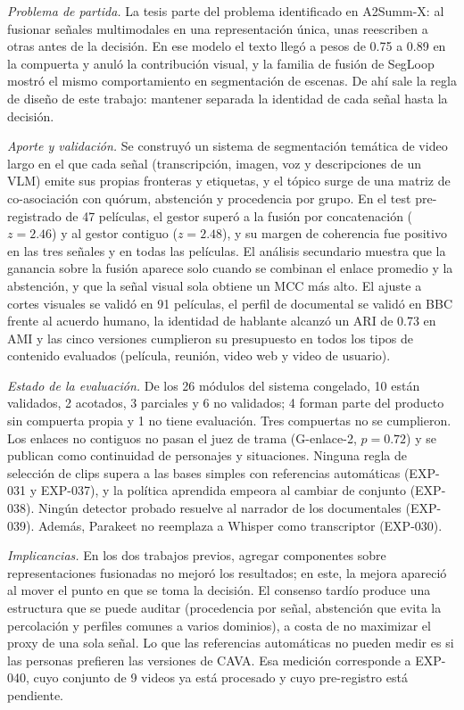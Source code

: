 
\textit{Problema de partida.} La tesis parte del problema identificado en A2Summ-X: al
fusionar señales multimodales en una representación única, unas reescriben a otras antes de
la decisión. En ese modelo el texto llegó a pesos de 0.75 a 0.89 en la compuerta y anuló la
contribución visual, y la familia de fusión de SegLoop mostró el mismo comportamiento en
segmentación de escenas. De ahí sale la regla de diseño de este trabajo: mantener separada la
identidad de cada señal hasta la decisión.

\textit{Aporte y validación.} Se construyó un sistema de segmentación temática de video largo
en el que cada señal (transcripción, imagen, voz y descripciones de un VLM) emite sus propias
fronteras y etiquetas, y el tópico surge de una matriz de co-asociación con quórum,
abstención y procedencia por grupo. En el test pre-registrado de 47 películas, el gestor
superó a la fusión por concatenación ($z = 2.46$) y al gestor contiguo ($z = 2.48$), y su
margen de coherencia fue positivo en las tres señales y en todas las películas. El análisis
secundario muestra que la ganancia sobre la fusión aparece solo cuando se combinan el enlace
promedio y la abstención, y que la señal visual sola obtiene un MCC más alto. El ajuste a
cortes visuales se validó en 91 películas, el perfil de documental se validó en BBC frente
al acuerdo humano, la identidad de hablante alcanzó un ARI de 0.73 en AMI y las cinco
versiones cumplieron su presupuesto en todos los tipos de contenido evaluados (película,
reunión, video web y video de usuario).

\textit{Estado de la evaluación.} De los 26 módulos del sistema congelado, 10 están
validados, 2 acotados, 3 parciales y 6 no validados; 4 forman parte del producto sin
compuerta propia y 1 no tiene evaluación. Tres compuertas no se cumplieron. Los enlaces no
contiguos no pasan el juez de trama (G-enlace-2, $p = 0.72$) y se publican como continuidad
de personajes y situaciones. Ninguna regla de selección de clips supera a las bases simples
con referencias automáticas (EXP-031 y EXP-037), y la política aprendida empeora al cambiar
de conjunto (EXP-038). Ningún detector probado resuelve al narrador de los documentales
(EXP-039). Además, Parakeet no reemplaza a Whisper como transcriptor (EXP-030).

\textit{Implicancias.} En los dos trabajos previos, agregar componentes sobre
representaciones fusionadas no mejoró los resultados; en este, la mejora apareció al mover
el punto en que se toma la decisión. El consenso tardío produce una estructura que se puede auditar (procedencia
por señal, abstención que evita la percolación y perfiles comunes a varios dominios), a
costa de no maximizar el proxy de una sola señal. Lo que las referencias automáticas no
pueden medir es si las personas prefieren las versiones de CAVA. Esa medición corresponde a
EXP-040, cuyo conjunto de 9 videos ya está procesado y cuyo pre-registro está pendiente.
